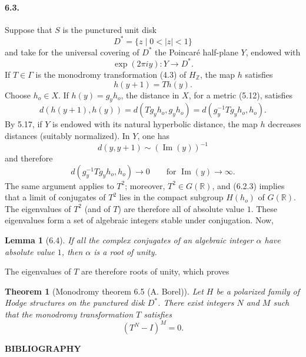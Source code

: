 \documentclass[10pt]{article}
\newcommand{\R}{\mathbb R}
\newcommand{\Z}{\mathbb Z}
\theoremstyle{deligne}
\newtheorem*{theorem}{Theorem}
\newtheorem*{lemma}{Lemma}
\begin{document}
\paragraph{6.3.}
Suppose that $S$ is the punctured unit disk
\[
  D^*=\{z\mid 0<|z|<1\}
\]
and take for the universal covering of $D^*$ the Poincaré half-plane $Y$, endowed with
\[
  \exp(2\pi i y):Y\longrightarrow D^*.
\]
If $T\in\Gamma$ is the monodromy transformation (4.3) of $H_\Z$, the map $h$ satisfies
\[
\tag{6.3.1}
  h(y+1)=T h(y).
\]
Choose $h_o\in X$. If $h(y)=g_yh_o$, the distance in $X$, for a metric (5.12), satisfies
\[
\tag{6.3.2}
  d(h(y+1),h(y))=d(Tg_yh_o,g_yh_o)=d(g_y^{-1}Tg_yh_o,h_o).
\]
By 5.17, if $Y$ is endowed with its natural hyperbolic distance, the map $h$ decreases distances (suitably normalized). In $Y$, one has
\[
  d(y,y+1)\sim (\operatorname{Im}(y))^{-1}
\]
and therefore
\[
\tag{6.3.3}
  d(g_y^{-1}Tg_yh_o,h_o)\longrightarrow 0\qquad\text{for }\operatorname{Im}(y)\to\infty .
\]
The same argument applies to $T^2$; moreover, $T^2\in G(\R)$, and (6.2.3) implies that a limit of conjugates of $T^2$ lies in the compact subgroup $H(h_o)$ of $G(\R)$. The eigenvalues of $T^2$ (and of $T$) are therefore all of absolute value $1$.
These eigenvalues form a set of algebraic integers stable under conjugation. Now,

\begin{lemma}[6.4]
If all the complex conjugates of an algebraic integer $\alpha$ have absolute value $1$, then $\alpha$ is a root of unity.
\end{lemma}

The eigenvalues of $T$ are therefore roots of unity, which proves

\begin{theorem}[Monodromy theorem 6.5 (A. Borel)]
Let $H$ be a polarized family of Hodge structures on the punctured disk $D^*$. There exist integers $N$ and $M$ such that the monodromy transformation $T$ satisfies
\[
  (T^N-I)^M=0.
\]
\end{theorem}

\begin{center}
\bfseries BIBLIOGRAPHY
\end{center}
\end{document}
